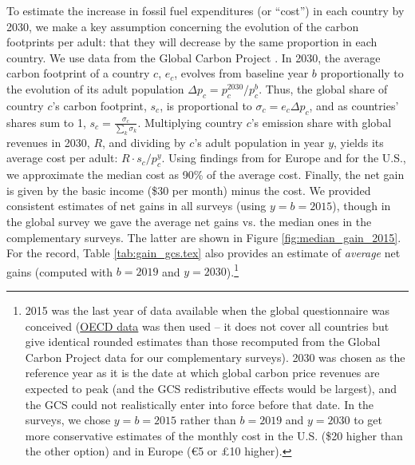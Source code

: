 To estimate the increase in fossil fuel expenditures (or ``cost'') in each country by 2030, we make a key assumption concerning the evolution of the carbon footprints per adult: that they will decrease by the same proportion %
in each country. We use data from the Global Carbon Project \citep{peters_synthesis_2012}. 
In 2030, the average carbon footprint of a country $c$, $e_c$, evolves from baseline year $b$ proportionally to the evolution of its adult population $\Delta p_c = p^{2030}_c/p^b_c$. Thus, the global share of country $c$'s carbon footprint, $s_c$, is proportional to $\sigma_c = e_c \Delta p_c$, and as countries' shares sum to 1, $s_c = \frac{\sigma_c}{\sum_k \sigma_k}$. Multiplying country $c$'s emission share with global revenues in 2030, $R$, and dividing by $c$'s adult population in year $y$, yields its average cost per adult: $R \cdot s_c / p^y_c$. %
Using findings from \citet{ivanova_unequal_2020} for Europe and \citet{fremstad_impact_2019} for the U.S., we approximate the median cost as 90\% of the average cost. Finally, the net gain is given by the basic income (\$30 per month) minus the cost. We provided consistent estimates of net gains in all surveys (using $y = b = 2015$), though in the global survey we gave the average net gains vs. the median ones in the complementary surveys. The latter are shown in Figure \ref{fig:median_gain_2015}. 
For the record, Table \ref{tab:gain_gcs.tex} also provides an estimate of \textit{average} net gains (computed with $b = 2019$ and $y = 2030$).\footnote{2015 was the last year of data available when the global questionnaire was conceived (\href{https://stats.oecd.org/Index.aspx?DataSetCode=IO_GHG_2019}{OECD data} was then used -- it does not cover all countries but give identical rounded estimates than those recomputed from the Global Carbon Project data for our complementary surveys). 2030 was chosen as the reference year as it is the date at which global carbon price revenues are expected to peak (and the GCS redistributive effects would be largest), and the GCS could not realistically enter into force before that date. In the surveys, we chose $y = b = 2015$ rather than $b = 2019$ and $y = 2030$ to get more conservative estimates of the monthly cost in the U.S. (\$20 higher than the other option) and in Europe (\euro{5} or £10 higher).}%

